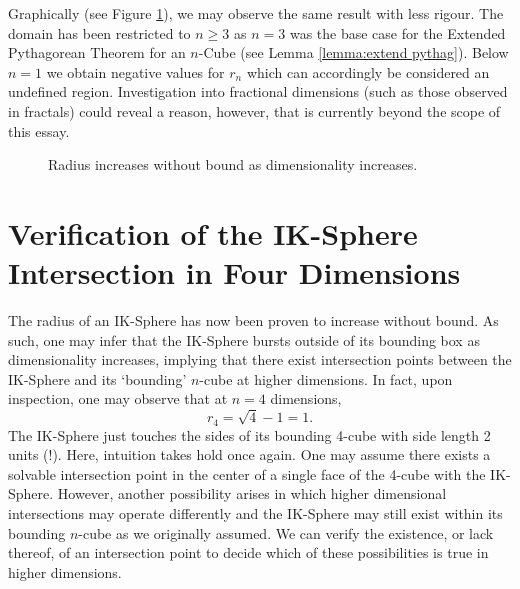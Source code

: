 Graphically (see Figure \ref{fig:radius increases graph}), we may observe the same result with less rigour. The domain has been restricted to $n\geq3$ as $n=3$ was the base case for the Extended Pythagorean Theorem for an $n$-Cube (see Lemma \ref{lemma:extend pythag}). Below $n=1$ we obtain negative values for $r_n$ which can accordingly be considered an undefined region. Investigation into fractional dimensions (such as those observed in fractals) could reveal a reason, however, that is currently beyond the scope of this essay.
\begin{figure}[H]
    \centering
    \caption{Radius increases without bound as dimensionality increases.}
    \label{fig:radius increases graph}
\end{figure}






\section{Verification of the IK-Sphere Intersection in Four Dimensions}\label{section:verify intersection}
The radius of an IK-Sphere has now been proven to increase without bound. As such, one may infer that the IK-Sphere bursts outside of its bounding box as dimensionality increases, implying that there exist intersection points between the IK-Sphere and its `bounding' $n$-cube at higher dimensions. In fact, upon inspection, one may observe that at $n=4$ dimensions, $$r_4=\sqrt{4}-1=1.$$ The IK-Sphere just touches the sides of its bounding 4-cube with side length 2 units (!). Here, intuition takes hold once again. One may assume there exists a solvable intersection point in the center of a single face of the 4-cube with the IK-Sphere. However, another possibility arises in which higher dimensional intersections may operate differently and the IK-Sphere may still exist within its bounding $n$-cube as we originally assumed. We can verify the existence, or lack thereof, of an intersection point to decide which of these possibilities is true in higher dimensions.

